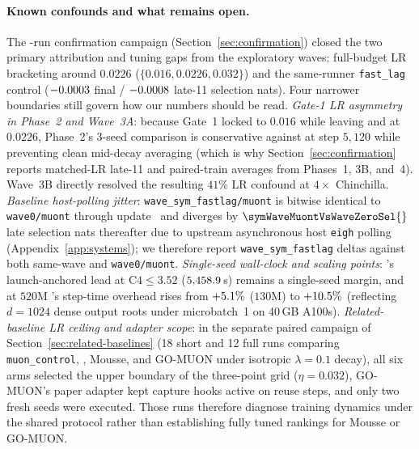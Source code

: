 \paragraph{Known confounds and what remains open.}
The \confTotalRuns{}-run confirmation campaign (Section~\ref{sec:confirmation})
closed the two primary attribution and tuning gaps from the exploratory waves:
full-budget LR bracketing around $0.0226$ ($\{0.016, 0.0226, 0.032\}$) and the
same-runner \texttt{fast\_lag}  control ($-0.0003{}$
final / $-0.0008{}$ late-11 selection nats). Four narrower
boundaries still govern how our numbers should be read.
\emph{Gate-1 LR asymmetry in Phase~2 and Wave~3A}: because Gate~1 locked
 to $0.016$ while leaving  and  at
$0.0226$, Phase~2's 3-seed comparison is conservative against 
at step $5{,}120$ while preventing clean mid-decay averaging (which is why
Section~\ref{sec:confirmation} reports matched-LR late-11 and paired-train
averages from Phases~1, 3B, and~4). Wave~3B directly resolved the resulting
$41\%$ LR confound at $4\times$ Chinchilla.
\emph{Baseline host-polling jitter}: \texttt{wave\_sym\_fastlag/muont} is
bitwise identical to \texttt{wave0/muont} through update~\symWaveExactSteps{} and
diverges by $\symWaveMuontVsWaveZeroSel{}$ late selection nats thereafter due to
upstream asynchronous host \texttt{eigh} polling
(Appendix~\ref{app:systems}); we therefore report \texttt{wave\_sym\_fastlag}
deltas against both same-wave  and \texttt{wave0/muont}.
\emph{Single-seed wall-clock and scaling points}: 's
launch-anchored lead at $\text{C4}\le 3.52$ ($5{,}458.9$\,s)
remains a single-seed margin, and at $520\text{M}$ 's
step-time overhead rises from $+5.1\%$ ($130\text{M}$) to
$+10.5\%$ (reflecting $d=1024$ dense output roots under
microbatch~1 on 40\,GB A100s).
\emph{Related-baseline LR ceiling and adapter scope}: in the separate paired
campaign of Section~\ref{sec:related-baselines} (18 short and 12 full runs
comparing \texttt{muon\_control}, , Mousse, and GO-MUON under
isotropic $\lambda = 0.1$ decay), all six arms selected the upper boundary of
the three-point grid ($\eta = 0.032$), GO-MUON's paper adapter kept capture
hooks active on reuse steps, and only two fresh seeds were executed. Those runs
therefore diagnose training dynamics under the shared protocol rather than
establishing fully tuned rankings for Mousse or GO-MUON.

